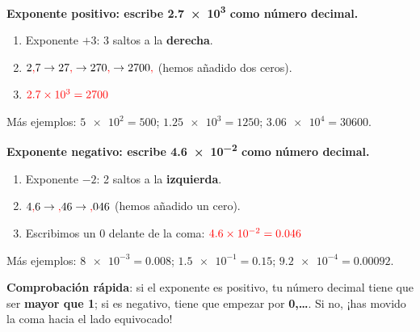 \begin{example}
    \textbf{Exponente positivo: escribe \num{2.7e3} como número decimal.}
    \begin{enumerate}[label=\numberballmDarkTeal]
        \item Exponente \(+3\): 3 saltos a la \textbf{derecha}.
        \item \(2\textcolor{red}{\mathbf{,}} 7 \to 27\textcolor{red}{\mathbf{,}} \to 270\textcolor{red}{\mathbf{,}} \to 2700\textcolor{red}{\mathbf{,}}\) (hemos añadido dos ceros).
        \item \(\textcolor{red}{\num{2.7e3} = \num{2700}}\)
    \end{enumerate}
    Más ejemplos: \(\num{5e2} = 500\); \quad \(\num{1.25e3} = 1250\); \quad \(\num{3.06e4} = \num{30600}\).
\end{example}

\begin{example}
    \textbf{Exponente negativo: escribe \num{4.6e-2} como número decimal.}
    \begin{enumerate}[label=\numberballmDarkTeal]
        \item Exponente \(-2\): 2 saltos a la \textbf{izquierda}.
        \item \(4\textcolor{red}{\mathbf{,}} 6 \to \textcolor{red}{\mathbf{,}} 46 \to \textcolor{red}{\mathbf{,}} 046\) (hemos añadido un cero).
        \item Escribimos un 0 delante de la coma: \(\textcolor{red}{\num{4.6e-2} = \num{0.046}}\)
    \end{enumerate}
    Más ejemplos: \(\num{8e-3} = \num{0.008}\); \quad \(\num{1.5e-1} = \num{0.15}\); \quad \(\num{9.2e-4} = \num{0.00092}\).
\end{example}

\begin{marker}
    \textbf{Comprobación rápida}: si el exponente es positivo, tu número decimal tiene que ser \textbf{mayor que 1}; si es negativo, tiene que empezar por \textbf{0,\ldots}. Si no, ¡has movido la coma hacia el lado equivocado!
\end{marker}

